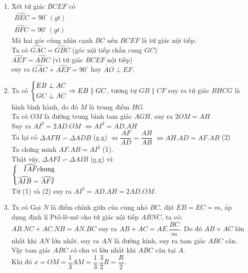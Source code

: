 \begin{ex}
{\begin{center}
    \end{center}
    \begin{enumerate}
        \item Xét tứ giác $BCEF$ có \\
        $
        \begin{aligned}
        \widehat{BEC}=90^\circ\, (gt)\\
        \widehat{BFC}=90^\circ\, (gt)
        \end{aligned}
        $\\
        Mà hai góc cùng nhìn cạnh $BC$  nên $BCEF$ là tứ giác nội tiếp.\\
        Ta có $\widehat{GAC}=\widehat{GBC}$ (góc nội tiếp chắn cung $GC$)\\
        $\widehat{AEF}=\widehat{ABC}$ (vì tứ giác $BCEF$ nội tiếp)\\
        suy ra $\widehat{GAC}+\widehat{AEF}=90^{\circ}$ hay $AO \perp EF$.
        \item Ta có $\left\{\begin{aligned}EB\perp AC\\ GC\perp AC\end{aligned}\right.\Rightarrow EB\parallel GC$, tương tự  $GB\parallel CF$ 
         suy ra tứ giác $BHCG$ là hình bình hành, do đó $M$ là trung điểm $HG$.\\
         Ta có $OM$ là đường trung bình tam giác $AGH$, suy ra $2OM=AH$\\
         Suy ra $AI^2=2AD.OM$ $\Leftrightarrow AI^2=AD.AH$\\
         Ta lại có $\Delta AFH \backsim \Delta ADB$ (g.g) $\Leftrightarrow \dfrac{AF}{AD}=\dfrac{AH}{AB}$ $\Leftrightarrow AH.AD=AF.AB$   (2)\\
         Ta chứng minh $AF.AB=AI^2$  (1).\\
          Thật vậy, $\Delta AFI \backsim \Delta AIB$ (g.g) vì:\\
         $\left\{\begin{aligned}\widehat{IAF} \mbox{chung}\\ \widehat{AIB}=\widehat{AFI}\end{aligned}\right.$\\
       Từ (1) và (2) suy ra $AI^2=AD.AH=2AD.OM$.
        \item Ta có
      Gọi $N$ là điểm chính giữa của cung nhỏ $BC$, đặt $EB=EC=m$, áp dụng định lí  Ptô-lê-mê cho tứ giác nội tiếp $ABNC$, ta có: $AB.NC+AC.NB=AN.BC$ suy ra $AB+AC=AE.\dfrac{BC}{m}$. Do đó $AB+AC$ lớn nhất khi $AN$ lớn nhất, suy ra $AN$ là đường kính, suy ra tam giác $ABC$ cân. Vậy tam giác $ABC$ có chu vi lớn nhất khi $ABC$ cân tại $A$. \\
      Khi đó $x=OM=\dfrac{1}{3}AM=\dfrac{1}{3}.\dfrac{3}{2}R=\dfrac{R}{2}$.
        \end{enumerate}
    }
\end{ex}

